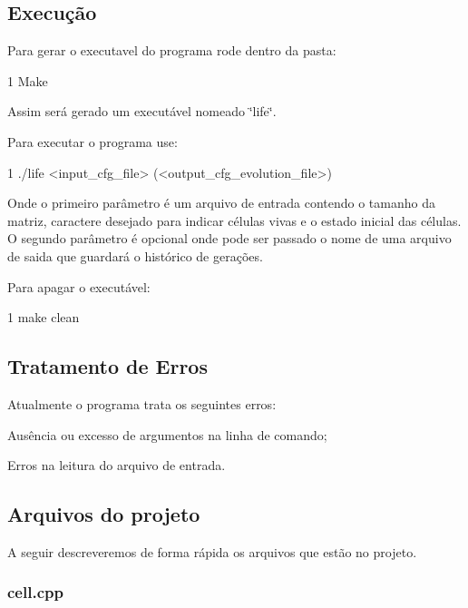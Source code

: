 \subsection*{Execução}

Para gerar o executavel do programa rode dentro da pasta\+:


\begin{DoxyCode}
1 Make
\end{DoxyCode}
 Assim será gerado um executável nomeado \char`\"{}life\char`\"{}.

Para executar o programa use\+:


\begin{DoxyCode}
1 ./life <input\_cfg\_file> (<output\_cfg\_evolution\_file>)
\end{DoxyCode}


Onde o primeiro parâmetro é um arquivo de entrada contendo o tamanho da matriz, caractere desejado para indicar células vivas e o estado inicial das células. O segundo parâmetro é opcional onde pode ser passado o nome de uma arquivo de saida que guardará o histórico de gerações.

Para apagar o executável\+:


\begin{DoxyCode}
1 make clean
\end{DoxyCode}


\subsection*{Tratamento de Erros}

Atualmente o programa trata os seguintes erros\+:


\begin{DoxyItemize}
\item Ausência ou excesso de argumentos na linha de comando;
\item Erros na leitura do arquivo de entrada.
\end{DoxyItemize}

\subsection*{Arquivos do projeto}

A seguir descreveremos de forma rápida os arquivos que estão no projeto.

\subsubsection*{cell.\+cpp}

